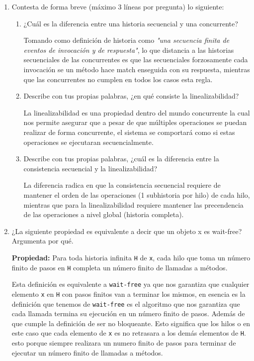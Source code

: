 \begin{enumerate}
    \item Contesta de forma breve (máximo 3 líneas por pregunta) lo siguiente:

    \begin{enumerate}
        \item ¿Cuál es la diferencia entre una historia secuencial y una concurrente?

        Tomando como definición de historia como \textit{"una secuencia finita de eventos de invocación y de respuesta"}, lo que distancia a las historias secuenciales de las concurrentes es que las secuenciales forzosamente cada invocación se un método hace match enseguida con su respuesta, mientras que las concurrentes no cumplen en todos los casos esta regla. 
        
        \item Describe con tus propias palabras, ¿en qué consiste la linealizabilidad?

        La linealizabilidad es una propiedad dentro del mundo concurrente la cual nos permite asegurar que a pesar de que múltiples operaciones se puedan realizar de forma concurrente, el sistema se comportará como si estas operaciones se ejecutaran secuencialmente. 
        
        \item Describe con tus propias palabras, ¿cuál es la diferencia entre la consistencia secuencial y la linealizabilidad?

        La diferencia radica en que la consistencia secuencial requiere de mantener el orden de las operaciones (1 subhistoria por hilo) de cada hilo, mientras que para la linealizabilidad requiere mantener las precendencia de las operaciones a nivel global (historia completa).

        \hfill
    \end{enumerate}

    \item ¿La siguiente propiedad es equivalente a decir que un objeto x es wait-free?
    Argumenta por qué.

    \textbf{Propiedad:} Para toda historia infinita \texttt{H} de \texttt{x}, cada hilo que toma un número finito de pasos en \texttt{H} completa un número finito de llamadas a métodos.

    Esta definición es equivalente a \texttt{wait-free} ya que nos garantiza que cualquier elemento \texttt{x} en \texttt{H} con pasos finitos van a terminar los mismos, en esencia es la definición que tenemos de \texttt{wait-free} es el algoritmo que nos garantiza que cada llamada termina su ejecución en un número finito de pasos. Además de que cumple la definición de ser no bloqueante. Esto significa que los hilos o en este caso que cada elemento de \texttt{x} es no retrasara a los demás elementos de \texttt{H}. esto porque siempre realizara un numero finito de pasos para terminar de ejecutar un número finito de llamadas a métodos.


\end{enumerate}
